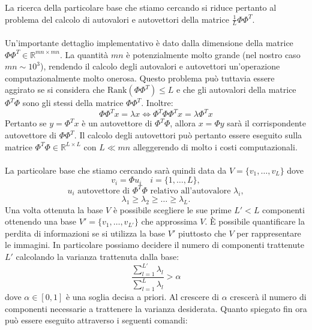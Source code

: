 La ricerca della particolare base che stiamo cercando si riduce pertanto al problema del calcolo di autovalori e autovettori della matrice  \(\frac{1}{L}\Phi \Phi^T\).
\\
\\
Un'importante dettaglio implementativo è dato dalla dimensione della matrice \(\Phi\Phi^T \in \mathbb{R}^{mn \times mn}\). La quantità \(mn\)  è potenzialmente molto grande (nel nostro caso \(mn \sim 10^3\)), rendendo il calcolo degli autovalori e autovettori un'operazione computazionalmente molto onerosa. Questo problema può tuttavia essere aggirato se si considera che \(\text{Rank}(\Phi\Phi^T) \leq L \) e che gli autovalori della matrice \(\Phi^T \Phi\) sono gli stessi della matrice \(\Phi \Phi^T\). Inoltre:
\[ \Phi\Phi^T x = \lambda x \iff \Phi^T \Phi \Phi^T x = \lambda \Phi^T x
    \]
Pertanto se \(y = \Phi^T x\) è un autovettore di \(\Phi^T \Phi\), allora \(x = \Phi y\) sarà il corrispondente autovettore di \( \Phi\Phi^T \). Il calcolo degli autovettori può pertanto essere eseguito sulla matrice \(\Phi^T \Phi \in \mathbb{R}^{L \times L}\) con \(L \ll mn \) alleggerendo di molto i costi computazionali.
\\
\\
La particolare base che stiamo cercando sarà quindi data da  \(V = \{v_1, \dots, v_L\}\) dove 
\[ v_i = \Phi u_i \quad i = \{1, \dots, L\},\]
\[u_i \text{ autovettore di } \Phi^T\Phi \text{ relativo all'autovalore } \lambda_i ,\]
\[\lambda_1 \geq \lambda_2 \geq \dots \geq \lambda_L.\]
Una volta ottenuta la base \(V\) è possibile scegliere le sue prime \(L'<L\) componenti ottenendo una base \(V' = \{v_1, \dots , v_{L'}\}\) che approssima \(V\). È possibile quantificare la perdita di informazioni se si utilizza la base \(V'\) piuttosto che \(V\) per rappresentare le immagini. In particolare possiamo decidere il numero di componenti trattenute \(L'\) calcolando la varianza trattenuta dalla base:
\begin{equation}\label{variance}
    \frac{ \sum \limits_{l=1}^{L'} \lambda_l}{ \sum \limits_{l=1}^{L}\lambda_l } > \alpha  
\end{equation}
dove \(\alpha \in [0,1]\) è una soglia decisa a priori. Al crescere di \(\alpha\) crescerà il numero di componenti necessarie a trattenere la varianza desiderata.
Quanto spiegato fin ora può essere eseguito attraverso i seguenti comandi:

